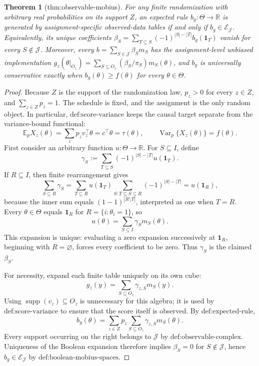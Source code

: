 \documentclass{article}
\newtheorem{theorem}{Theorem}
\begin{document}
\begin{theorem}[thm:observable-mobius]\label{thm:observable-mobius}
For any finite randomization with arbitrary real probabilities on its support \(Z\), an expected rule \(b_g:\Theta\to\mathbb R\) is generated by assignment-specific observed-data tables if and only if \(b_g\in\mathcal E_{\mathcal J}\). Equivalently, its unique coefficients \(\beta_S=\sum_{T\subseteq S}(-1)^{|S|-|T|}b_g(\mathbf 1_T)\) vanish for every \(S\notin\mathcal J\). Moreover, every \(b=\sum_{S\in\mathcal J}\beta_Sm_S\) has the assignment-level unbiased implementation \(g_z(\theta|_{O_z})=\sum_{S\subseteq O_z}(\beta_S/\pi_S)m_S(\theta)\), and \(b_g\) is universally conservative exactly when \(b_g(\theta)\ge f(\theta)\) for every \(\theta\in\Theta\).
\end{theorem}
\begin{proof}
Because \(Z\) is the support of the randomization law, \(p_z>0\) for every \(z\in Z\), and \(\sum_{z\in Z}p_z=1\).  The schedule is fixed, and the assignment is the only random object.  In particular, \(\text{def:score-variance}\) keeps the causal target separate from the variance-bound functional:
\[
 \mathbb E_pX_z(\theta)=\sum_zp_zv_z^\top\theta
 =c^\top\theta=\tau(\theta),\qquad
 \operatorname{Var}_p\{X_z(\theta)\}=f(\theta).
\]
First consider an arbitrary function \(u:\Theta\to\mathbb R\).  For \(S\subseteq I\), define
\[
 \gamma_S:=\sum_{T\subseteq S}(-1)^{|S|-|T|}u(\mathbf 1_T).
\]
If \(R\subseteq I\), then finite rearrangement gives
\[
 \sum_{S\subseteq R}\gamma_S
 =\sum_{T\subseteq R}u(\mathbf 1_T)
   \sum_{S:T\subseteq S\subseteq R}(-1)^{|S|-|T|}
 =u(\mathbf 1_R),
\]
because the inner sum equals \((1-1)^{|R\setminus T|}\), interpreted as one when \(T=R\).  Every \(\theta\in\Theta\) equals \(\mathbf 1_R\) for \(R=\{i:\theta_i=1\}\), so
\[
 u(\theta)=\sum_{S\subseteq I}\gamma_Sm_S(\theta).
\]
This expansion is unique: evaluating a zero expansion successively at \(\mathbf 1_R\), beginning with \(R=\varnothing\), forces every coefficient to be zero.  Thus \(\gamma_S\) is the claimed \(\beta_S\).

For necessity, expand each finite table uniquely on its own cube:
\[
 g_z(y)=\sum_{S\subseteq O_z}\gamma_{z,S}m_S(y).
\]
Using \(\operatorname{supp}(v_z)\subseteq O_z\) is unnecessary for this algebra; it is used by \(\text{def:score-variance}\) to ensure that the score itself is observed.  By \(\text{def:expected-rule}\),
\[
 b_g(\theta)=\sum_{z\in Z}p_z\sum_{S\subseteq O_z}
       \gamma_{z,S}m_S(\theta).
\]
Every support occurring on the right belongs to \(\mathcal J\) by \(\text{def:observable-complex}\).  Uniqueness of the Boolean expansion therefore implies \(\beta_S=0\) for \(S\notin\mathcal J\), hence \(b_g\in\mathcal E_{\mathcal J}\) by \(\text{def:boolean-mobius-spaces}\).


\end{proof}
\end{document}
